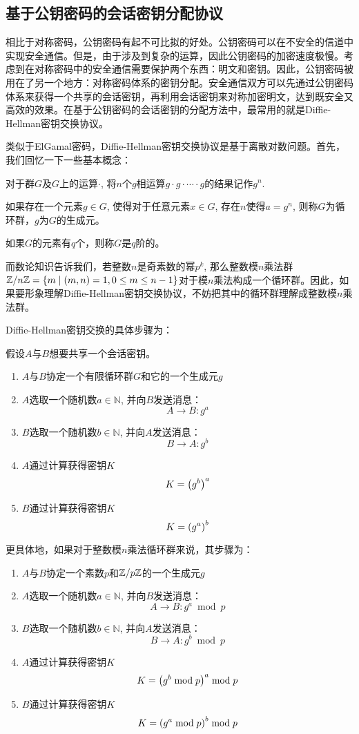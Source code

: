 \subsection{基于公钥密码的会话密钥分配协议}
相比于对称密码，公钥密码有起不可比拟的好处。公钥密码可以在不安全的信道中实现安全通信。但是，由于涉及到复杂的运算，因此公钥密码的加密速度极慢。考虑到在对称密码中的安全通信需要保护两个东西：明文和密钥。因此，公钥密码被用在了另一个地方：对称密码体系的密钥分配。安全通信双方可以先通过公钥密码体系来获得一个共享的会话密钥，再利用会话密钥来对称加密明文，达到既安全又高效的效果。在基于公钥密码的会话密钥的分配方法中，最常用的就是Diffie-Hellman密钥交换协议。\par
类似于ElGamal密码，Diffie-Hellman密钥交换协议是基于离散对数问题。首先，我们回忆一下一些基本概念：\par
对于群$G$及$G$上的运算$\cdot$, 将$n$个$g$相运算$g\cdot g\cdot \cdots \cdot g$的结果记作$g^n$.\par
如果存在一个元素$g\in G$, 使得对于任意元素$x\in G$, 存在$n$使得$a=g^n$, 则称$G$为循环群，$g$为$G$的生成元。\par
如果$G$的元素有$q$个，则称$G$是$q$阶的。\par
而数论知识告诉我们，若整数$n$是奇素数的幂$p^k$, 那么整数模$n$乘法群$\mathbb{Z}/n\mathbb{Z}=\{m\mid \left( {m, n}\right)=1, 0\leq m\leq n-1\}$对于模$n$乘法构成一个循环群。因此，如果要形象理解Diffie-Hellman密钥交换协议，不妨把其中的循环群理解成整数模$n$乘法群。\par
Diffie-Hellman密钥交换的具体步骤为：\par
假设$A$与$B$想要共享一个会话密钥。
\begin{enumerate}
	\item $A$与$B$协定一个有限循环群$G$和它的一个生成元$g$
	\item $A$选取一个随机数$a\in\mathbb{N}$, 并向$B$发送消息：
	\[A\to B: g^a\]
	\item $B$选取一个随机数$b\in\mathbb{N}$, 并向$A$发送消息：
	\[B\to A: g^b\]
	\item $A$通过计算获得密钥$K$
	\[K=\left( {g^b}\right)^a\]
	\item $B$通过计算获得密钥$K$
	\[K=\left( {g^a}\right)^b\]
\end{enumerate}

更具体地，如果对于整数模$n$乘法循环群来说，其步骤为：
\begin{enumerate}
	\item $A$与$B$协定一个素数$p$和$\mathbb{Z}/p\mathbb{Z}$的一个生成元$g$
	\item $A$选取一个随机数$a\in\mathbb{N}$, 并向$B$发送消息：
	\[A\to B: g^a\bmod{p}\]
	\item $B$选取一个随机数$b\in\mathbb{N}$, 并向$A$发送消息：
	\[B\to A: g^b\bmod{p}\]
	\item $A$通过计算获得密钥$K$
	\[K=\left( {g^b\bmod{p}}\right)^a\bmod{p}\]
	\item $B$通过计算获得密钥$K$
	\[K=\left( {g^a\bmod{p}}\right)^b\bmod{p}\]
\end{enumerate}
